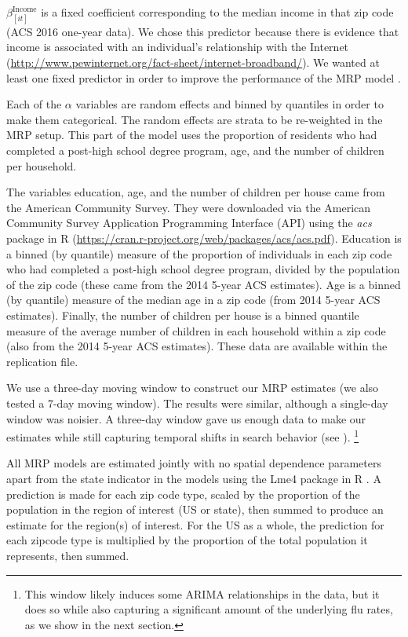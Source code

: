 \documentclass[12pt]{article}
\begin{document}
$\beta_{[it]}^{\text{Income}}$ is a fixed coefficient corresponding to the median income in that zip code (ACS 2016 one-year data). We chose this predictor because there is evidence that income is associated with an individual's relationship with the Internet (\url{http://www.pewinternet.org/fact-sheet/internet-broadband/}). We wanted at least one fixed predictor in order to improve the performance of the MRP model \citep{buttice_and_highton_2013}.

Each of the $\alpha$ variables are random effects and binned by quantiles in order to make them categorical. The random effects are strata to be re-weighted in the MRP setup. This part of the model uses the proportion of residents who had completed a post-high school degree program, age, and the number of children per household.

The variables education, age, and the number of children per house came from the American Community Survey. They were downloaded via the American Community Survey Application Programming Interface (API) using the \emph{acs} package in R (\url{https://cran.r-project.org/web/packages/acs/acs.pdf}). Education is a binned (by quantile) measure of the proportion of individuals in each zip code who had completed a post-high school degree program, divided by the population of the zip code (these came from the 2014 5-year ACS estimates). Age is a binned (by quantile) measure of the median age in a zip code (from 2014 5-year ACS estimates). Finally, the number of children per house is a binned quantile measure of the average number of children in each household within a zip code (also from the 2014 5-year ACS estimates). These data are available within the replication file. 

We use a three-day moving window to construct our MRP estimates (we also tested a 7-day moving window). The results were similar, although a single-day window was noisier. A three-day window gave us enough data to make our estimates while still capturing temporal shifts in search behavior (see \citet{yang_etal_2015inference}). \footnote{This window likely induces some ARIMA relationships in the data, but it does so while also capturing a significant amount of the underlying flu rates, as we show in the next section.} 

All MRP models are estimated jointly with no spatial dependence parameters apart from the state indicator in the models using the Lme4 package in R \citep{bates_etal_2015}. A prediction is made for each zip code type, scaled by the proportion of the population in the region of interest (US or state), then summed to produce an estimate for the region(s) of interest. For the US as a whole, the prediction for each zipcode type is multiplied by the proportion of the total population it represents, then summed. 
\end{document}
